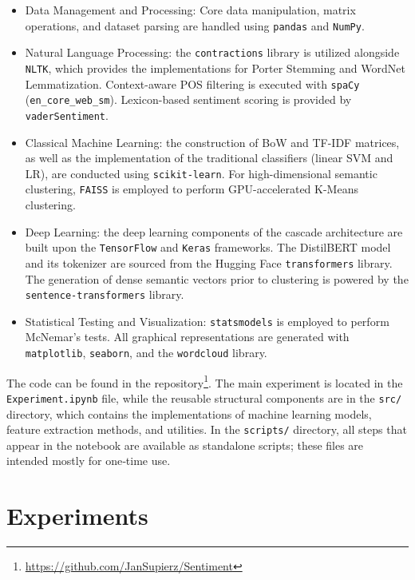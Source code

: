 \documentclass[a4paper,fleqn]{cas-dc}
\newcommand{\logreg}{LR}
\newcommand{\code}[1]{\texttt{#1}}
\begin{document}
\begin{itemize}
	\item {Data Management and Processing:} Core data manipulation, matrix operations, and dataset parsing are handled using \code{pandas} and \code{NumPy}.
	
	\item {Natural Language Processing:} the \code{contractions} library is utilized alongside \code{NLTK}, which provides the implementations for Porter Stemming and WordNet Lemmatization. Context-aware POS filtering is executed with \code{spaCy} (\texttt{en\_core\_web\_sm}). Lexicon-based sentiment scoring is provided by \code{vaderSentiment}.
	
	\item {Classical Machine Learning:} the construction of BoW and TF-IDF matrices, as well as the implementation of the traditional classifiers (linear SVM and \logreg), are conducted using \code{scikit-learn}. For high-dimensional semantic clustering, \code{FAISS} is employed to perform GPU-accelerated K-Means clustering.
	
	\item {Deep Learning:} the deep learning components of the cascade architecture are built upon the \code{TensorFlow} and \code{Keras} frameworks. The DistilBERT model and its tokenizer are sourced from the Hugging Face \code{transformers} library. The generation of dense semantic vectors prior to clustering is powered by the \code{sentence-transformers} library.
	
	\item {Statistical Testing and Visualization:} \code{statsmodels} is employed to perform McNemar's tests. All graphical representations are generated with \code{matplotlib}, \code{seaborn}, and the \code{wordcloud} library.
\end{itemize}

The code can be found in the repository\footnote{\url{https://github.com/JanSupierz/Sentiment}}.
The main experiment is located in the \code{Experiment.ipynb} file, while the reusable structural components are in the \code{src/} directory, which contains the implementations of machine learning models, feature extraction methods, and utilities.
In the \code{scripts/} directory, all steps that appear in the notebook are available as standalone scripts; these files are intended mostly for one‑time use.
\section{Experiments} \label{chap:experiments}
\end{document}
